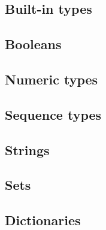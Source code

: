 \documentclass[a4paper, twoside, 8pt]{extarticle}
\begin{document}
\renewcommand{\footrulewidth}{0.4pt}

\begin{multicols*}{3}
\section{Built-in types}

\subsection{Booleans}

\subsection{Numeric types}


\subsection{Sequence types}

\subsection{Strings}

\subsection{Sets}

\subsection{Dictionaries}

\end{multicols*}
\end{document}
